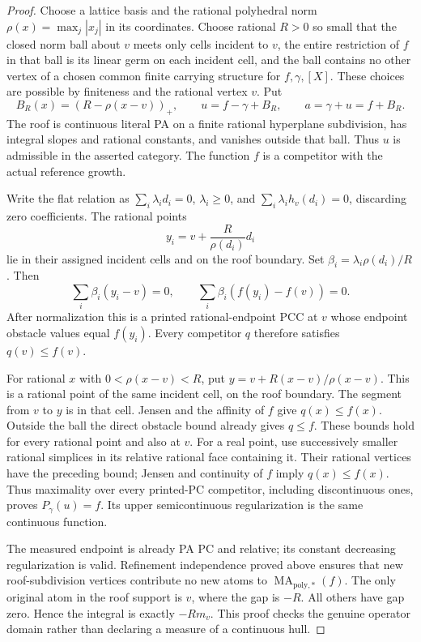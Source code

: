 \documentclass[11pt]{article}
\newcommand{\MAstar}{\operatorname{MA}_{\mathrm{poly},*}}
\begin{document}
\begin{proof}
Choose a lattice basis and the rational polyhedral norm
\(\rho(x)=\max_j|x_j|\) in its coordinates. Choose rational \(R>0\)
so small that the closed norm ball about \(v\) meets only cells incident
to \(v\), the entire restriction of \(f\) in that ball is its linear
germ on each incident cell, and the ball contains no other vertex of
a chosen common finite carrying structure for \(f,\gamma,[X]\).
These choices are possible by finiteness and the rational vertex \(v\).
Put
\begin{equation}\label{roof}
 B_R(x)=(R-\rho(x-v))_+,\qquad
 u=f-\gamma+B_R,\qquad a=\gamma+u=f+B_R.
\end{equation}
The roof is continuous literal PA on a finite rational hyperplane
subdivision, has integral slopes and rational constants, and vanishes
outside that ball. Thus \(u\) is admissible in the asserted category.
The function \(f\) is a competitor with the actual reference growth.

Write the flat relation as
\(\sum_i\lambda_i d_i=0\), \(\lambda_i\geq0\), and
\(\sum_i\lambda_i h_v(d_i)=0\), discarding zero coefficients.
The rational points
\[
 y_i=v+\frac{R}{\rho(d_i)}d_i
\]
lie in their assigned incident cells and on the roof boundary. Set
\(\beta_i=\lambda_i\rho(d_i)/R\).
Then
\[
 \sum_i\beta_i(y_i-v)=0,\qquad
 \sum_i\beta_i(f(y_i)-f(v))=0.
\]
After normalization this is a printed rational-endpoint PCC at \(v\)
whose endpoint obstacle values equal \(f(y_i)\).
Every competitor \(q\) therefore satisfies \(q(v)\leq f(v)\).

For rational \(x\) with \(0<\rho(x-v)<R\), put
\(y=v+R(x-v)/\rho(x-v)\).
This is a rational point of the same incident cell, on the roof
boundary. The segment from \(v\) to \(y\) is in that cell. Jensen
and the affinity of \(f\) give \(q(x)\leq f(x)\).
Outside the ball the direct obstacle bound already gives \(q\leq f\).
These bounds hold for every rational point and also at \(v\).
For a real point, use successively smaller rational simplices in its
relative rational face containing it. Their rational vertices have
the preceding bound; Jensen and continuity of \(f\) imply \(q(x)\leq f(x)\).
Thus maximality over every printed-PC competitor, including discontinuous
ones, proves \(P_\gamma(u)=f\). Its upper semicontinuous regularization is
the same continuous function.

The measured endpoint is already PA PC and relative; its constant
decreasing regularization is valid. Refinement independence proved
above ensures that new roof-subdivision vertices contribute no new
atoms to \(\MAstar(f)\). The only original atom in the roof support
is \(v\), where the gap is \(-R\). All others have gap zero. Hence
the integral is exactly \(-R m_v\). This proof checks the genuine
operator domain rather than declaring a measure of a continuous hull.
\end{proof}
\end{document}
